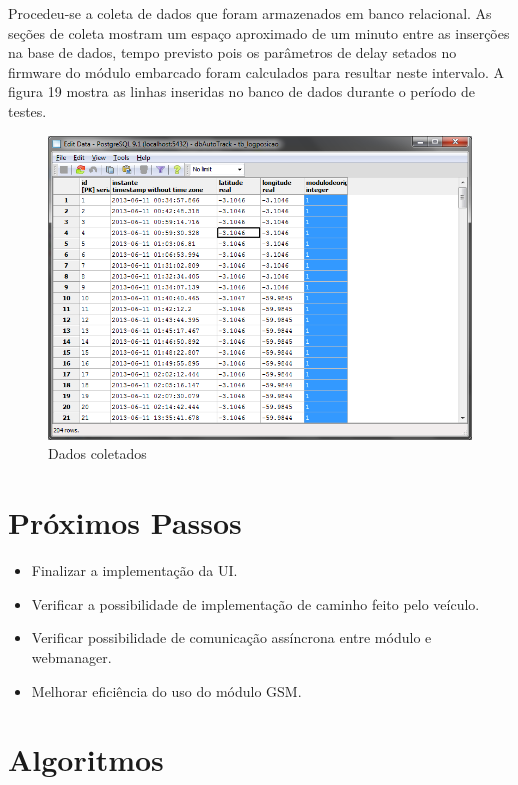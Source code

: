 Procedeu-se a coleta de dados que foram armazenados em banco relacional. As seções de coleta mostram um espaço aproximado de um minuto entre as inserções na base de dados, tempo previsto pois os parâmetros de delay setados no firmware do módulo embarcado foram calculados para resultar neste intervalo. A figura 19 mostra as linhas inseridas no banco de dados durante o período de testes.

\begin{figure}[!htb]
	\centering
	\includegraphics[width=12.00cm\textwidth]{figures/dados_coletados.png}
	\caption{Dados coletados}
	\label{Figura 19}
\end{figure}

\vspace{200pt}


\section{Próximos Passos}

\begin{itemize}
	\item Finalizar a implementação da UI.
	\item Verificar a possibilidade de implementação de caminho feito pelo veículo.
	\item Verificar possibilidade de comunicação assíncrona entre módulo e webmanager.
	\item Melhorar eficiência do uso do módulo GSM.	
\end{itemize}




\section{Algoritmos}

